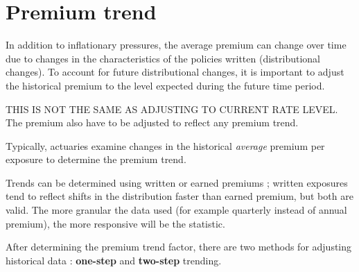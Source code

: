 \documentclass[11pt, english]{memoir}
\numberwithin{definition}{section}
\begin{document}
	\section{Premium trend}
	In addition to inflationary pressures, the average premium can change over time due to changes in the characteristics of the policies written (distributional changes). To account for future distributional changes, it is important to adjust the historical premium to the level expected during the future time period. 
	
	THIS IS NOT THE SAME AS ADJUSTING TO CURRENT RATE LEVEL. The premium also have to be adjusted to reflect any premium trend. 
	
	Typically, actuaries examine changes in the historical \emph{average} premium per exposure to determine the premium trend. 
	
	Trends can be determined using written or earned premiums ; written exposures tend to reflect shifts in the distribution faster than earned premium, but both are valid. The more granular the data used (for example quarterly instead of annual premium), the more responsive will be the statistic. 
	
	After determining the premium trend factor, there are two methods for adjusting historical data : \textbf{one-step} and \textbf{two-step} trending. 
	
	
	
	
	
	
	
	
	
	
	
	
	
	
	
	
	
	
	
	
	
	
	
	
	
	
	
	
	
	
	
	
	
	
	
	
	
	
\end{document}
